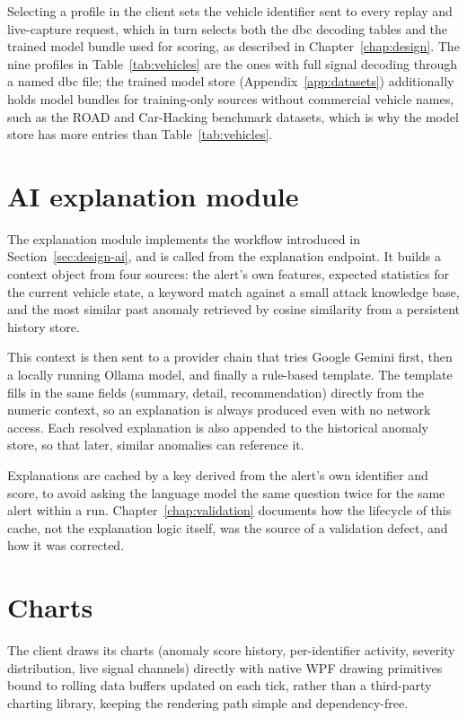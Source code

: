 Selecting a profile in the client sets the vehicle identifier sent to every replay and live-capture request, which in turn selects both the \gls{dbc} decoding tables and the trained model bundle used for scoring, as described in Chapter~\ref{chap:design}. The nine profiles in Table~\ref{tab:vehicles} are the ones with full signal decoding through a named \gls{dbc} file; the trained model store (Appendix~\ref{app:datasets}) additionally holds model bundles for training-only sources without commercial vehicle names, such as the ROAD and Car-Hacking benchmark datasets, which is why the model store has more entries than Table~\ref{tab:vehicles}.

\section{AI explanation module}

The explanation module implements the workflow introduced in Section~\ref{sec:design-ai}, and is called from the explanation endpoint. It builds a context object from four sources: the alert's own features, expected statistics for the current vehicle state, a keyword match against a small attack knowledge base, and the most similar past anomaly retrieved by cosine similarity from a persistent history store.

This context is then sent to a provider chain that tries Google Gemini first, then a locally running Ollama model, and finally a rule-based template. The template fills in the same fields (summary, detail, recommendation) directly from the numeric context, so an explanation is always produced even with no network access. Each resolved explanation is also appended to the historical anomaly store, so that later, similar anomalies can reference it.

Explanations are cached by a key derived from the alert's own identifier and score, to avoid asking the language model the same question twice for the same alert within a run. Chapter~\ref{chap:validation} documents how the lifecycle of this cache, not the explanation logic itself, was the source of a validation defect, and how it was corrected.

\section{Charts}

The client draws its charts (anomaly score history, per-identifier activity, severity distribution, live signal channels) directly with native WPF drawing primitives bound to rolling data buffers updated on each tick, rather than a third-party charting library, keeping the rendering path simple and dependency-free.

